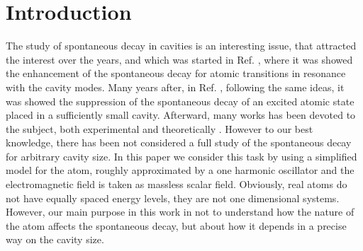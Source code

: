 \documentclass[10pt,english,twocolumn]{revtex4}
\begin{document}
\maketitle

\section{Introduction}
The study of spontaneous decay in cavities is an interesting issue, that attracted the interest over the years,  and which was started in Ref. \cite{Purcell},
where it was showed the enhancement of the spontaneous decay for atomic transitions in resonance with the cavity modes.
Many years after, in Ref. \cite{Kleppner},
following the same ideas, it was showed the suppression of the spontaneous decay of an excited atomic state placed in a sufficiently small cavity.
Afterward, many works has been devoted to the subject, both experimental \cite{Gabrielse, hulet,haroche2,David,Goy} and theoretically
\cite{Dowling,Trong,Gieben,Milonni,Milonni2,Stobinska,Barut,Alber}. However to our best knowledge, there has been not considered a full study of the spontaneous decay for arbitrary cavity size. In this paper we consider this task by using a simplified model for the atom, roughly approximated by a one harmonic oscillator and the electromagnetic field is taken as massless scalar field. Obviously, real atoms do not have equally spaced energy levels, 
they are not one dimensional systems. However, our main purpose in this work in not to understand how the nature of the atom affects the spontaneous decay, but about how it depends in a precise way on the cavity size.
\end{document}
